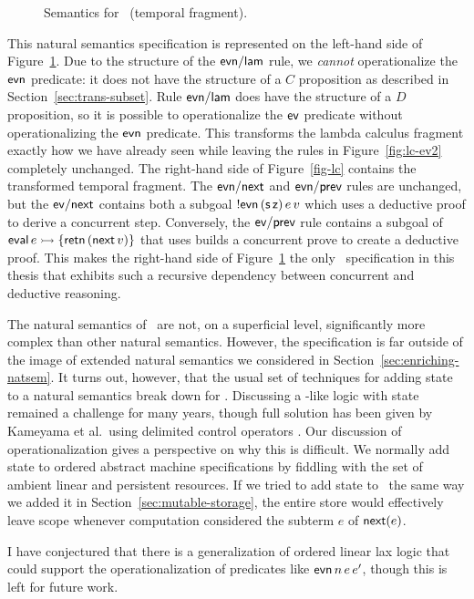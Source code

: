 \begin{figure}[tp]
\begin{minipage}[b]{0.450\linewidth}
\end{minipage}
\hspace{0.5cm}
\begin{minipage}[b]{0.50\linewidth}
\end{minipage}
\caption{Semantics for \rowan~(temporal fragment).}
\label{fig:lc}
\end{figure}

This natural semantics specification is represented on the left-hand
side of Figure~\ref{fig:lc}. Due to the structure of the ${\sf
  evn/lam}$ rule, we {\it cannot} operationalize the ${\sf evn}$
predicate: it does not have the structure of a $C$ proposition as
described in Section~\ref{sec:trans-subset}. Rule ${\sf evn/lam}$ does
have the structure of a $D$ proposition, so it is possible to
operationalize the ${\sf ev}$ predicate without operationalizing the
${\sf evn}$ predicate. This transforms the lambda calculus fragment
exactly how we have already seen while leaving the rules in
Figure~\ref{fig:lc-ev2} completely unchanged. The right-hand side of
Figure~\ref{fig-lc} contains the transformed temporal fragment. The
${\sf evn/next}$ and ${\sf evn/prev}$ rules are unchanged, but the
${\sf ev/next}$ contains both a subgoal ${!}{\sf evn}\,({\sf s}\,{\sf
  z})\,e\,v$ which uses a deductive proof to derive a concurrent
step. Conversely, the ${\sf ev/prev}$ rule contains a subgoal of ${\sf
  eval}\,e \rightarrowtail \{ {\sf retn}\,({\sf next}\,v) \}$ that uses builds
a concurrent prove to create a deductive proof.  This makes the
right-hand side of Figure~\ref{fig:lc} the only \sls~specification in
this thesis that exhibits such a recursive dependency between
concurrent and deductive reasoning.

The natural semantics of \rowan~are not, on a superficial level,
significantly more complex than other natural semantics.  However, the
specification is far outside of the image of extended natural
semantics we considered in Section~\ref{sec:enriching-natsem}.  It
turns out, however, that the usual set of techniques for adding state
to a natural semantics break down for \rowan. Discussing a \rowan-like
logic with state remained a challenge for many years, though full
solution has been given by Kameyama et al.~using delimited control
operators \cite{kameyama11shifting}. Our discussion of
operationalization gives a perspective on why this is difficult. We
normally add state to ordered abstract machine specifications by
fiddling with the set of ambient linear and persistent resources.  If
we tried to add state to \rowan~the same way we added it in
Section~\ref{sec:mutable-storage}, the entire store would effectively
leave scope whenever computation considered the subterm $e$ of ${\sf
  next}(e)$.

I have conjectured that there is a generalization of ordered linear
lax logic that could support the operationalization of predicates like
${\sf evn}\,n\,e\,e'$, though this is left for future work.
